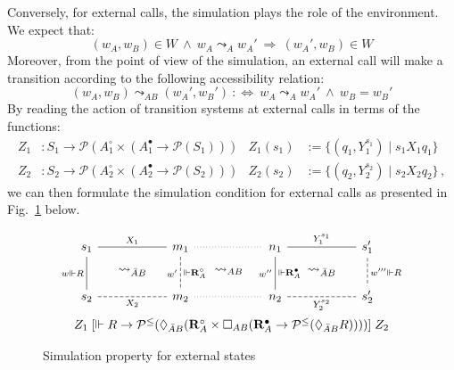 \documentclass[acmsmall,screen,review,anonymous]{acmart}
\newcommand{\que}{\circ}
\newcommand{\ans}{\bullet}
\begin{document}
Conversely, for external calls,
the simulation plays the role of the environment.
We expect that:
\[
  (w_A, w_B) \in W \:\wedge\:
  w_A \leadsto_A w_A' \:\Rightarrow\:
  (w_A', w_B) \in W
\]
Moreover,
from the point of view of the simulation,
an external call will make a transition according to
the following accessibility relation:
\[
  (w_A, w_B) \leadsto_{AB} (w_A', w_B') \::\Leftrightarrow\:
  w_A \leadsto_A w_A' \:\wedge\:
  w_B = w_B'
\]
By reading the action of transition systems at external calls
in terms of the functions:
\begin{align*}
  Z_1 &: S_1 \rightarrow
    \mathcal{P}(A_1^\que \times (A_1^\ans \rightarrow \mathcal{P}(S_1))) &
  Z_1(s_1) &:= \{ (q_1, Y_1^{s_1}) \mid s_1 \mathrel{X_1} q_1 \}
 \\
  Z_2 &: S_2 \rightarrow
    \mathcal{P}(A_2^\que \times (A_2^\ans \rightarrow \mathcal{P}(S_2))) &
  Z_2(s_2) &:= \{ (q_2, Y_2^{s_2}) \mid s_2 \mathrel{X_2} q_2 \}
  \,,
\end{align*}
we can then formulate the simulation condition for external calls
as presented in Fig.~\ref{fig:simext} below.

\begin{figure}[h]
  \[
    \begin{array}{c}
      \begin{tikzcd}[sep=tiny, column sep=small]
        s_1 \ar[rr, "X_1", dash] \ar[dd, "w \Vdash R"', dash] &&
        m_1 \ar[rr, dotted, dash] \ar[dd, "w'"', "{} \Vdash \mathbf{R}_A^\que", dash, dashed] &&
        n_1 \ar[rr, "Y_1^{s_1}", dash] \ar[dd, "w''"', "{} \Vdash \mathbf{R}_A^\ans", dash] &&
        s_1' \ar[dd, "w''' \Vdash R", dash, dashed]
        \\
        & \leadsto_{\bar{A}B} && \leadsto_{AB} && \leadsto_{\bar{A}B} &
        \\
        s_2 \ar[rr, "X_2"', dash, dashed] &&
        m_2 \ar[rr, dotted, dash] &&
        n_2 \ar[rr, "Y_2^{s_2}"', dash, dashed] &&
        s_2'
      \end{tikzcd}
      \vspace{1ex} \\
      Z_1
      \mathrel{[
        \Vdash R \rightarrow \mathcal{P}^\le(
          \Diamond_{\bar{A}B} (
          \mathbf{R}_A^\que \times
            \Box_{AB} (
            \mathbf{R}_A^\ans \rightarrow
            \mathcal{P}^\le(\Diamond_{\bar{A}B} R))))
      ]}
      Z_2
    \end{array}
  \]
  \caption{Simulation property for external states}
  \label{fig:simext}
\end{figure}
\end{document}
